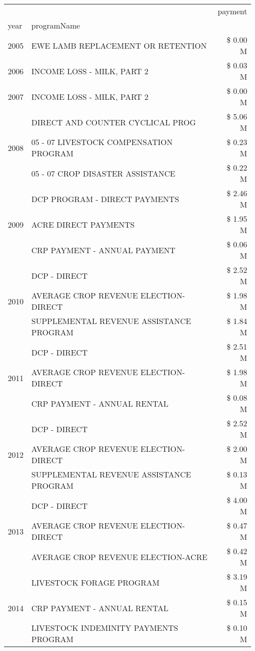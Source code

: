 \begin{tabular}{llr}
\toprule
 &  & payment \\
year & programName &  \\
\midrule
2005 & EWE LAMB REPLACEMENT OR RETENTION & \$ 0.00 M \\
\cline{1-3}
2006 & INCOME LOSS - MILK, PART 2 & \$ 0.03 M \\
\cline{1-3}
2007 & INCOME LOSS - MILK, PART 2 & \$ 0.00 M \\
\cline{1-3}
\multirow[t]{3}{*}{2008} & DIRECT AND COUNTER CYCLICAL PROG & \$ 5.06 M \\
 & 05 - 07 LIVESTOCK COMPENSATION PROGRAM & \$ 0.23 M \\
 & 05 - 07 CROP DISASTER ASSISTANCE & \$ 0.22 M \\
\cline{1-3}
\multirow[t]{3}{*}{2009} & DCP PROGRAM - DIRECT PAYMENTS & \$ 2.46 M \\
 & ACRE DIRECT PAYMENTS & \$ 1.95 M \\
 & CRP PAYMENT - ANNUAL PAYMENT & \$ 0.06 M \\
\cline{1-3}
\multirow[t]{3}{*}{2010} & DCP - DIRECT & \$ 2.52 M \\
 & AVERAGE CROP REVENUE ELECTION-DIRECT & \$ 1.98 M \\
 & SUPPLEMENTAL REVENUE ASSISTANCE PROGRAM & \$ 1.84 M \\
\cline{1-3}
\multirow[t]{3}{*}{2011} & DCP - DIRECT & \$ 2.51 M \\
 & AVERAGE CROP REVENUE ELECTION-DIRECT & \$ 1.98 M \\
 & CRP PAYMENT - ANNUAL RENTAL & \$ 0.08 M \\
\cline{1-3}
\multirow[t]{3}{*}{2012} & DCP - DIRECT & \$ 2.52 M \\
 & AVERAGE CROP REVENUE ELECTION-DIRECT & \$ 2.00 M \\
 & SUPPLEMENTAL REVENUE ASSISTANCE PROGRAM & \$ 0.13 M \\
\cline{1-3}
\multirow[t]{3}{*}{2013} & DCP - DIRECT & \$ 4.00 M \\
 & AVERAGE CROP REVENUE ELECTION-DIRECT & \$ 0.47 M \\
 & AVERAGE CROP REVENUE ELECTION-ACRE & \$ 0.42 M \\
\cline{1-3}
\multirow[t]{3}{*}{2014} & LIVESTOCK FORAGE PROGRAM & \$ 3.19 M \\
 & CRP PAYMENT - ANNUAL RENTAL & \$ 0.15 M \\
 & LIVESTOCK INDEMINITY PAYMENTS PROGRAM & \$ 0.10 M \\
\cline{1-3}

\end{tabular}
